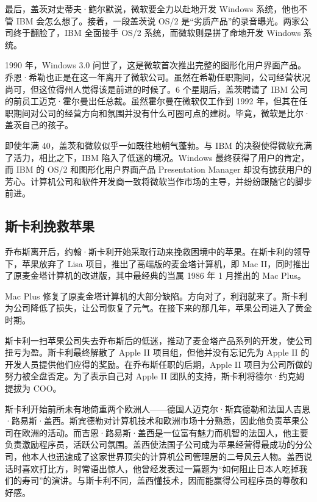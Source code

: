 \documentclass[12pt,UTF8]{ctexbook}
\begin{document}
最后，盖茨对史蒂夫·鲍尔默说，微软要全力以赴地开发 Windows 系统，他也不管 IBM 会怎么想了。接着，一段盖茨说 OS/2 是“劣质产品”的录音曝光。两家公司终于翻脸了，IBM 全面接手 OS/2 系统，而微软则是拼了命地开发 Windows 系统。

1990 年，Windows 3.0 问世了，这是微软首次推出完整的图形化用户界面产品。乔恩·希勒也正是在这一年离开了微软公司。虽然在希勒任职期间，公司经营状况尚可，但这位得州人觉得该是前进的时候了。6 个星期后，盖茨聘请了 IBM 公司的前员工迈克·霍尔曼出任总裁。虽然霍尔曼在微软仅工作到 1992 年，但其在任职期间对公司的经营方向和氛围并没有什么可圈可点的建树。毕竟，微软是比尔·盖茨自己的孩子。

即使年满 40，盖茨和微软似乎一如既往地朝气蓬勃。与 IBM 的决裂使得微软充满了活力，相比之下，IBM 陷入了低迷的境况。Windows 最终获得了用户的肯定，而 IBM 的 OS/2 和图形化用户界面产品 Presentation Manager 却没有掳获用户的芳心。计算机公司和软件开发商一致将微软当作市场的主导，并纷纷跟随它的脚步前进。





\subsection{斯卡利挽救苹果}


乔布斯离开后，约翰·斯卡利开始采取行动来挽救困境中的苹果。在斯卡利的领导下，苹果放弃了 Lisa 项目，推出了高端版的麦金塔计算机，即 Mac II，同时推出了原麦金塔计算机的改进版，其中最经典的当属 1986 年 1 月推出的 Mac Plus。

Mac Plus 修复了原麦金塔计算机的大部分缺陷。方向对了，利润就来了。斯卡利为公司降低了损失，让公司恢复了元气。在接下来的那几年，苹果公司进入了黄金时期。

斯卡利一扫苹果公司失去乔布斯后的低迷，推动了麦金塔产品系列的开发，使公司扭亏为盈。斯卡利最终解散了 Apple II 项目组，但他并没有忘记先为 Apple II 的开发人员提供他们应得的奖励。在乔布斯任职的后期，Apple II 项目为公司所做的努力被全盘否定。为了表示自己对 Apple II 团队的支持，斯卡利将德尔·约克姆提拔为 COO。

斯卡利开始前所未有地倚重两个欧洲人——德国人迈克尔·斯宾德勒和法国人吉恩·路易斯·盖西。斯宾德勒对计算机技术和欧洲市场十分熟悉，因此他负责苹果公司在欧洲的活动。而吉恩·路易斯·盖西是一位富有魅力而机智的法国人，他主要负责激励程序员，活跃公司氛围。盖西使法国子公司成为苹果经营得最成功的分公司，他本人也迅速成了这家世界顶尖的计算机公司管理层的二号风云人物。盖西说话时喜欢打比方，时常语出惊人，他曾经发表过一篇题为“如何阻止日本人吃掉我们的寿司”的演讲。与斯卡利不同，盖西懂技术，因而能赢得公司程序员的尊敬和好感。
\end{document}
